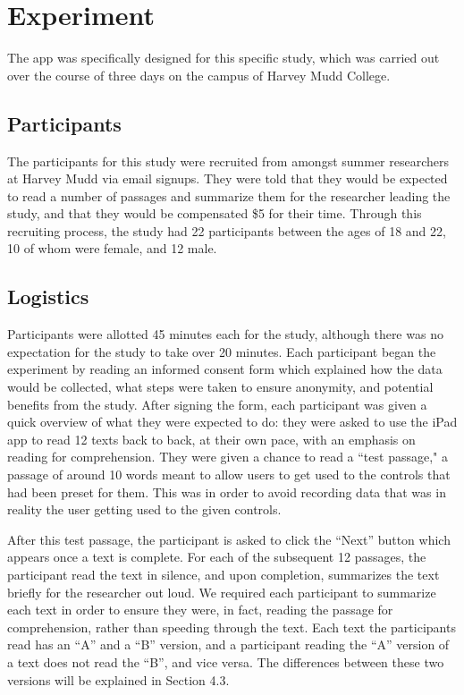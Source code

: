 \documentclass[11pt,letterpaper]{article}
\begin{document}
	\section{Experiment}
	\label{sec:exp}
	
	The app was specifically designed for this specific study, which was carried out over the course of three days on the campus of Harvey Mudd College.
	
	\subsection{Participants}
	
	The participants for this study were recruited from amongst summer researchers at Harvey Mudd via email signups. They were told that they would be expected to read a number of passages and summarize them for the researcher leading the study, and that they would be compensated \$5 for their time. Through this recruiting process, the study had 22 participants between the ages of 18 and 22, 10 of whom were female, and 12 male.
	
	\subsection{Logistics}
	
	Participants were allotted 45 minutes each for the study, although there was no expectation for the study to take over 20 minutes. Each participant began the experiment by reading an informed consent form which explained how the data would be collected, what steps were taken to ensure anonymity, and potential benefits from the study. After signing the form, each participant was given a quick overview of what they were expected to do: they were asked to use the iPad app to read 12 texts back to back, at their own pace, with an emphasis on reading for comprehension. They were given a chance to read a ``test passage," a passage of around 10 words meant to allow users to get used to the controls that had been preset for them. This was in order to avoid recording data that was in reality the user getting used to the given controls.
	
	After this test passage, the participant is asked to click the ``Next'' button which appears once a text is complete. For each of the subsequent 12 passages, the participant read the text in silence, and upon completion, summarizes the text briefly for the researcher out loud. We required each participant to summarize each text in order to ensure they were, in fact, reading the passage for comprehension, rather than speeding through the text. Each text the participants read has an ``A'' and a ``B'' version, and a participant reading the ``A'' version of a text does not read the ``B'', and vice versa. The differences between these two versions will be explained in Section 4.3.
	
\end{document}
